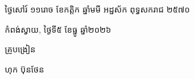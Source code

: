 \documentclass[a4paper,10pt]{article}
\begin{document}
\vspace{6pt}
{\centering
\hspace*{5.2cm}\begin{minipage}{11.5cm}
  \centering
  ថ្ងៃសៅរ៍ ១១រោច ខែកត្តិក ឆ្នាំមមី អដ្ឋស័ក ពុទ្ធសករាជ ២៥៧០\par
  កំពង់ស្វាយ, ថ្ងៃទី៥ ខែធ្នូ ឆ្នាំ២០២៦\par
  \vspace{2pt}
  {\muol គ្រូបង្រៀន\par}
  \vspace{32pt}
  \hfill{\muol ហុក ប៊ុនថែន}\hspace*{1.4cm}
\end{minipage}\par}
\end{document}
